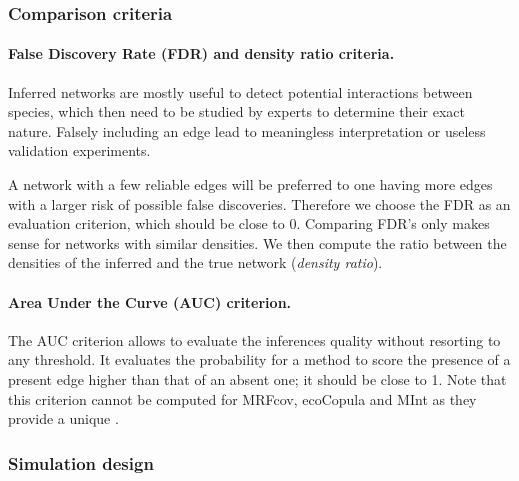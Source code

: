 \subsubsection{Comparison criteria}
 
\paragraph{False Discovery Rate (FDR) and density ratio criteria.}
Inferred networks are mostly useful to detect potential interactions between species, which then need to be studied by experts to determine their exact nature. Falsely including an edge lead to meaningless interpretation or useless validation experiments. 

A network with a few reliable edges will be preferred to one having more edges with a larger risk of possible false discoveries. Therefore we choose the FDR as an evaluation criterion, which should be close to 0. Comparing FDR's only makes sense for networks with similar densities. We then compute the ratio between the densities of the inferred and the true network ({\sl density ratio}).

\paragraph{Area Under the Curve (AUC) criterion.}
The AUC criterion allows to evaluate the inferences quality without resorting to any threshold. It evaluates the probability for a method to score the presence of a present edge higher than that of an absent one; it should be close to 1. Note that this criterion cannot be computed for MRFcov, ecoCopula and MInt as they provide a unique 
. 





\subsubsection{Simulation design}
 
